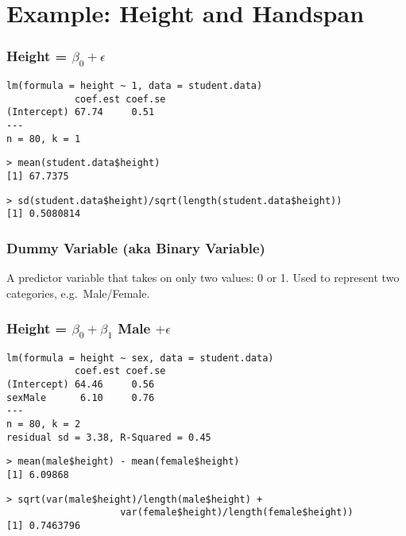 \section{Example: Height and Handspan}
\begin{frame}[fragile]
\frametitle{Height = $\beta_0 +  \epsilon$}
\footnotesize
\begin{verbatim}
lm(formula = height ~ 1, data = student.data)
            coef.est coef.se
(Intercept) 67.74     0.51  
---
n = 80, k = 1
\end{verbatim}
\pause
\begin{verbatim}
> mean(student.data$height)
[1] 67.7375
\end{verbatim}
\pause
\begin{verbatim}
> sd(student.data$height)/sqrt(length(student.data$height))
[1] 0.5080814
\end{verbatim}
\end{frame}

\begin{frame}
\frametitle{Dummy Variable (aka Binary Variable)}
 
A predictor variable that takes on only two values: 0 or 1. Used to represent two categories, e.g.\ Male/Female.
\end{frame}



\begin{frame}[fragile]
\frametitle{Height = $\beta_0 + \beta_1$ Male $+ \epsilon$}

\footnotesize
\begin{verbatim}
lm(formula = height ~ sex, data = student.data)
            coef.est coef.se
(Intercept) 64.46     0.56  
sexMale      6.10     0.76  
---
n = 80, k = 2
residual sd = 3.38, R-Squared = 0.45
\end{verbatim}
\pause
\begin{verbatim}
> mean(male$height) - mean(female$height)
[1] 6.09868
\end{verbatim}
\pause
\begin{verbatim}
> sqrt(var(male$height)/length(male$height) +
		 			var(female$height)/length(female$height))
[1] 0.7463796
\end{verbatim}
\end{frame}




